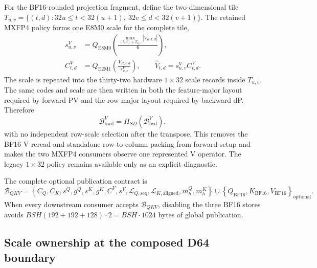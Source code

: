For the BF16-rounded projection fragment, define the two-dimensional tile
$T_{u,v}=\{(t,d):32u\le t<32(u+1),\ 32v\le d<32(v+1)\}$.  The retained
MXFP4 policy forms one E8M0 scale for the complete tile,
\begin{align}
  s^V_{u,v}&=Q_{\mathrm{E8M0}}\!\left(
    \frac{\max_{(t,d)\in T_{u,v}}|V_{R,t,d}|}{6}
  \right),\\
  C^V_{t,d}&=Q_{\mathrm{E2M1}}\!\left(
    \frac{V_{R,t,d}}{s^V_{u,v}}
  \right),\qquad
  \widehat V_{t,d}=s^V_{u,v}C^V_{t,d}.
  \label{eq:projection-native-v}
\end{align}
The scale is repeated into the thirty-two hardware $1\times32$ scale records
inside $T_{u,v}$.  The same codes and scale are then written in both the
feature-major layout required by forward PV and the row-major layout required
by backward dP.  Therefore
\begin{equation}
  \mathcal B^{V}_{\mathrm{bwd}}
  =\Pi_{SD}\!\left(\mathcal B^{V}_{\mathrm{fwd}}\right),
  \label{eq:mxfp4-v-transpose-consistency}
\end{equation}
with no independent row-scale selection after the transpose.  This removes
the BF16 V reread and standalone row-to-column packing from forward setup and
makes the two MXFP4 consumers observe one represented V operator.  The legacy
$1\times32$ policy remains available only as an explicit diagnostic.

The complete optional publication contract is
\begin{equation}
  \mathcal B_{QKV}=
  \left\{
    C_Q,C_K,s^Q,g^Q,s^K,g^K,C^V,s^V,
    \mathcal L_{Q,\mathrm{seq}},\mathcal L_{K,\mathrm{aligned}},
    m^Q_h,m^K_h
  \right\}
  \cup
  \left\{Q_{\mathrm{BF16}},K_{\mathrm{BF16}},V_{\mathrm{BF16}}\right\}_{\mathrm{optional}}.
  \label{eq:unified-qkv-bundle}
\end{equation}
When every downstream consumer accepts $\mathcal B_{QKV}$, disabling the
three BF16 stores avoids $BSH(192+192+128)\cdot2=BSH\cdot1024$ bytes of
global publication.

\subsection{Scale ownership at the composed D64 boundary}

